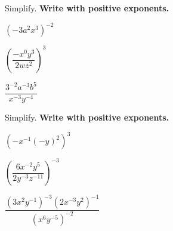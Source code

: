 \newpage

\begin{exercise} Simplify. \textbf{Write with positive exponents.}

	\noindent
	\begin{enumerate*}[label={(\arabic*)~}]
		\item $(-3a^2x^3)^{-2}$
		\item $\left(\dfrac{-x^0y^3}{2wz^2}\right)^3$
		\item $\dfrac{3^{-2}a^{-3}b^5}{x^{-3}y^{-4}}$
		\hfill\null
	\end{enumerate*}
\end{exercise}

\vfill
\begin{center}
	\hfill
\end{center}


\begin{exercise}
	Simplify. \textbf{Write with positive exponents.}

	\noindent
	\begin{enumerate*}[label={(\arabic*)~}]
		\item $\left(-x^{-1}(-y)^2\right)^3$
		\item $\left(\dfrac{6x^{-2}y^5}{2y^{-3}z^{-11}}\right)^{-3}$
		\item $\dfrac{(3 x^{2} y^{-1})^{-3}(2 x^{-3} y^{2})^{-1}}{(x^{6} y^{-5})^{-2}}$
		\hfill\null
	\end{enumerate*}
\end{exercise}

\vfill
\begin{center}
	\hfill
\end{center}

